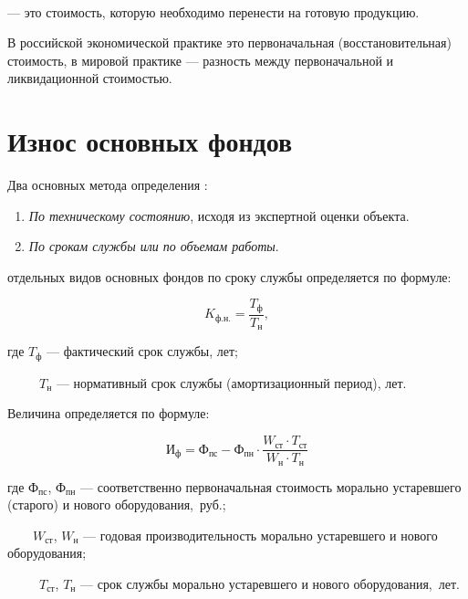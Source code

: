 \begin{definition}
    \normalfont
    ~\\
     --- это стоимость, которую
    необходимо перенести на готовую продукцию.
\end{definition}

В российской экономической практике это первоначальная
(восстановительная) стоимость, в мировой практике --- разность между
первоначальной и ликвидационной стоимостью.

\clearpage
\section{Износ основных фондов}

Два основных метода определения :

\begin{enumerate}
    \item \textit{По техническому состоянию}, исходя из экспертной оценки объекта.
    \item \textit{По срокам службы или по объемам работы}.
\end{enumerate}

\begin{tcolorbox}
 отдельных видов основных фондов по сроку
службы определяется по формуле:

\begin{equation}
    K_{\text{ф.н.}} = \frac{T_{\text{ф}}}{T_{\text{н}}},
\end{equation}

где $T_{\text{ф}}$ --- фактический срок службы, лет;

~~~~~$T_{\text{н}}$ --- нормативный срок службы (амортизационный период), лет.
\end{tcolorbox}

\begin{tcolorbox}
Величина  определяется по формуле:

\begin{equation}
    \text{И}_{\text{ф}} = \text{Ф}_{\text{пс}} - \text{Ф}_{\text{пн}} \cdot
    \frac{W_{\text{ст}} \cdot T_{\text{ст}}}{W_{\text{н}} \cdot T_{\text{н}}}
\end{equation}

где $\text{Ф}_{\text{пс}}$, $\text{Ф}_{\text{пн}}$ --- соответственно
первоначальная стоимость морально устаревшего (старого) и нового
оборудования,~руб.;

~~~~$W_{\text{ст}}$, $W_{\text{н}}$ --- годовая производительность морально
устаревшего и нового оборудования;

~~~~~$T_{\text{ст}}$, $T_{\text{н}}$ --- срок службы морально устаревшего и нового
оборудования,~лет.
\end{tcolorbox}

